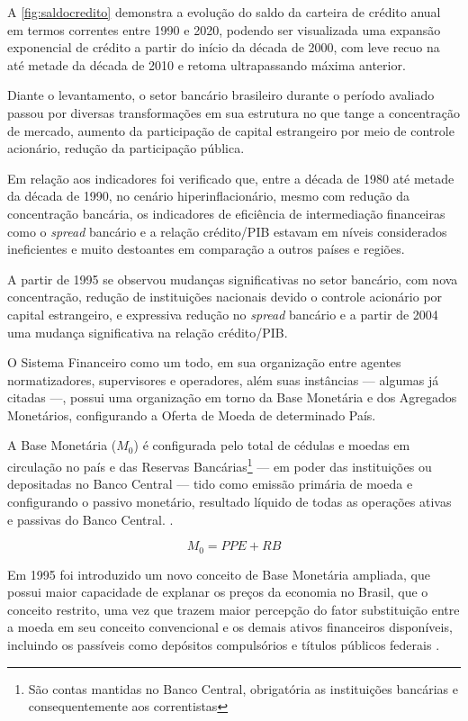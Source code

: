 \documentclass[12pt,openright,oneside,a4paper,chapter=TITLE,section=TITLE,subsection=TITLE,english,french,spanish,portugues,sumario=tradicional]{abntex2}
\begin{document}
A \autoref{fig:saldocredito} demonstra a evolução do saldo da carteira de
crédito anual em termos correntes entre 1990 e 2020, podendo ser visualizada
uma expansão exponencial de crédito a partir do início da década de 2000, com
leve recuo na até metade da década de 2010 e retoma ultrapassando máxima
anterior.

Diante o levantamento, o setor bancário brasileiro durante o período avaliado
passou por diversas transformações em sua estrutura no que tange a concentração
de mercado, aumento da participação de capital estrangeiro por meio de controle
acionário, redução da participação pública.

Em relação aos indicadores foi verificado que, entre a década de 1980 até metade da década de 1990, no cenário hiperinflacionário, mesmo com redução da
concentração bancária, os indicadores de eficiência de intermediação
financeiras como o \emph{spread} bancário e a relação crédito/PIB estavam em níveis
considerados ineficientes e muito destoantes em comparação a outros países e
regiões.

A partir de 1995 se observou mudanças significativas no setor bancário, com
nova concentração, redução de instituições nacionais devido o controle
acionário por capital estrangeiro, e expressiva redução no \emph{spread} bancário e
a partir de 2004 uma mudança significativa na relação crédito/PIB.

O Sistema Financeiro como um todo, em sua organização entre agentes normatizadores, supervisores e operadores, além suas instâncias --- algumas já citadas ---, possui uma organização em torno da Base Monetária e dos Agregados Monetários, configurando a Oferta de Moeda de determinado País.

A Base Monetária (\(M_0\)) é configurada pelo total de cédulas e moedas em circulação no país e das Reservas Bancárias\footnote{São contas mantidas no Banco Central, obrigatória as instituições bancárias e consequentemente aos correntistas} --- em poder das instituições ou depositadas no Banco Central --- tido como emissão primária de moeda e configurando o passivo monetário, resultado líquido de todas as operações ativas e passivas do Banco Central. \cite{bcb:2019}.

\[
M_0 = PPE + RB
\]

Em 1995 foi introduzido um novo conceito de Base Monetária ampliada, que possui maior capacidade de explanar os preços da economia no Brasil, que o conceito restrito, uma vez que trazem maior percepção do fator substituição entre a moeda em seu conceito convencional e os demais ativos financeiros disponíveis, incluindo os passíveis como depósitos compulsórios e títulos públicos federais \cite{bcb:2019}.
\end{document}
